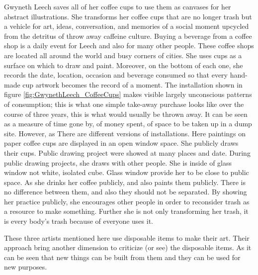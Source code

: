 Gwyneth Leech saves all of her coffee cups to use them as canvases for her abstract illustrations. She transforms her coffee cups that are no longer trash but a vehicle for art, ideas, conversation, and memories of a social moment upcycled from the detritus of throw away caffeine culture. Buying a beverage from a coffee shop is a daily event for Leech and also for many other people. These coffee shops are located all around the world and busy corners of cities. She uses cups as a surface on which to draw and paint. Moreover, on the bottom of each one, she records the date, location, occasion and beverage consumed so that every hand-made cup artwork becomes the record of a moment. The installation shown in figure \ref{fig:GwynethLeech_CoffeeCups} makes visible largely unconscious patterns of consumption; this is what one simple take-away purchase looks like over the course of three years, this is what would usually be thrown away. It can be seen as a measure of time gone by, of money spent, of space to be taken up in a dump site. However, as \cite{leech2015cups}  There are different versions of installations. Here paintings on paper coffee cups are displayed in an open window space. She publicly draws their cups. Public drawing project were showed at many places and date. During public drawing projects, she draws with other people. She is inside of glass window not white, isolated cube. Glass window provide her to be close to public space. As she drinks her coffee publicly, and also paints them publicly. There is no difference between them, and also they should not be separated. By showing her practice publicly, she encourages other people in order to reconsider trash as a resource to make something. Further she is not only transforming her trash, it is every body’s trash because of everyone uses it.

These three artists mentioned here use disposable items to make their art. Their approach bring another dimension to criticize (or see) the disposable items. As it can be seen that new things can be built from them and they can be used for new purposes.

